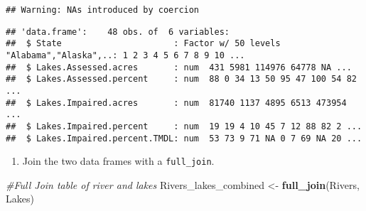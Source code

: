 \documentclass[]{article}
\newenvironment{Shaded}{\begin{snugshade}}{\end{snugshade}}
\newcommand{\CommentTok}[1]{\textcolor[rgb]{0.56,0.35,0.01}{\textit{#1}}}
\newcommand{\KeywordTok}[1]{\textcolor[rgb]{0.13,0.29,0.53}{\textbf{#1}}}
\newcommand{\NormalTok}[1]{#1}
\newcommand{\OperatorTok}[1]{\textcolor[rgb]{0.81,0.36,0.00}{\textbf{#1}}}
\newcommand{\StringTok}[1]{\textcolor[rgb]{0.31,0.60,0.02}{#1}}
\providecommand{\tightlist}{%
  \setlength{\itemsep}{0pt}\setlength{\parskip}{0pt}}
\begin{document}
\begin{verbatim}
## Warning: NAs introduced by coercion
\end{verbatim}

\begin{Shaded}
\end{Shaded}

\begin{verbatim}
## 'data.frame':    48 obs. of  6 variables:
##  $ State                      : Factor w/ 50 levels "Alabama","Alaska",..: 1 2 3 4 5 6 7 8 9 10 ...
##  $ Lakes.Assessed.acres       : num  431 5981 114976 64778 NA ...
##  $ Lakes.Assessed.percent     : num  88 0 34 13 50 95 47 100 54 82 ...
##  $ Lakes.Impaired.acres       : num  81740 1137 4895 6513 473954 ...
##  $ Lakes.Impaired.percent     : num  19 19 4 10 45 7 12 88 82 2 ...
##  $ Lakes.Impaired.percent.TMDL: num  53 73 9 71 NA 0 7 69 NA 20 ...
\end{verbatim}

\begin{enumerate}
\def\labelenumi{\arabic{enumi}.}
\setcounter{enumi}{9}
\tightlist
\item
  Join the two data frames with a \texttt{full\_join}.
\end{enumerate}

\begin{Shaded}
\begin{Highlighting}[]
\CommentTok{#Full Join table of river and lakes}
\NormalTok{Rivers_lakes_combined <-}\StringTok{ }\KeywordTok{full_join}\NormalTok{(Rivers, Lakes)}
\end{Highlighting}
\end{Shaded}
\end{document}
